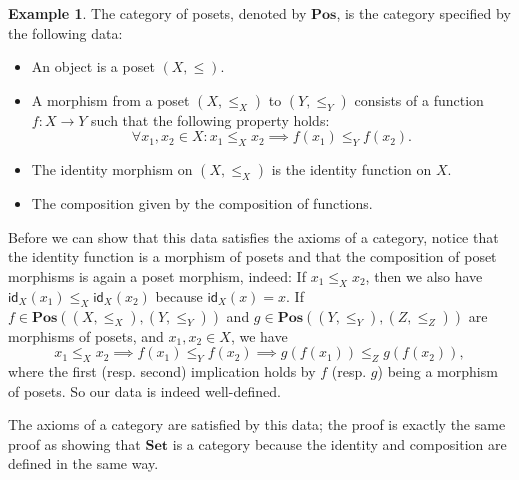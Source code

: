 \documentclass[a4paper,11pt, oneside,titlepage=false]{scrbook}
\theoremstyle{plain}
\theoremstyle{definition}
\newtheorem{que}[thm]{Question}
\newtheorem{exa}[thm]{Example}
\newtheorem{exer}[thm]{Exercise}
\newcommand{\cfont}[1]{\ensuremath{\mathsf{#1}}}
\newcommand{\Catb}[1]{\mathbf{#1}}
\newcommand{\SET}{\Catb{Set}}
\newcommand{\POS}{\Catb{Pos}}
\newcommand{\CHom}[3]{{#1}(#2,#3)}
\newcommand{\Id}[1][]{\cfont{id}_{#1}}
\begin{document}
\begin{exa}\label{example:poset} The category of posets, denoted by $\POS$, is the category specified by the following data:
\begin{itemize}
\item An object is a poset $(X,\leq)$.
\item A morphism from a poset $(X,\leq_X)$ to $(Y,\leq_Y)$ consists of a function $f:X\to Y$ such that the following property holds:
\[
\forall x_1, x_2 \in X: x_1\leq_X x_2 \implies f(x_1)\leq_Y f(x_2).
\]
\item The identity morphism on $(X,\leq_X)$ is the identity function on $X$.
\item The composition given by the composition of functions.
\end{itemize}

Before we can show that this data satisfies the axioms of a category, notice that the identity function is a morphism of posets and that the composition of poset morphisms is again a poset morphism, indeed: If $x_1\leq_X x_2$, then we also have $\Id[X](x_1) \leq_X \Id[X](x_2)$ because $\Id[X](x) = x$. If $f\in\CHom{\POS}{(X,\leq_X)}{(Y,\leq_Y)}$ and $g\in\CHom{\POS}{(Y,\leq_Y)} {(Z,\leq_Z)}$ are morphisms of posets, and $x_1,x_2\in X$, we have
\[
  x_1\leq_X x_2 \implies f(x_1)\leq_Y f(x_2) \implies g(f(x_1))\leq_Z g(f(x_2)),
\]
where the first (resp. second) implication holds by $f$ (resp. $g$) being a morphism of posets. So our data is indeed well-defined.

The axioms of a category are satisfied by this data; the proof is exactly the same proof as showing that $\SET$ is a category because the identity and composition are defined in the same way.
\end{exa}


\end{document}
